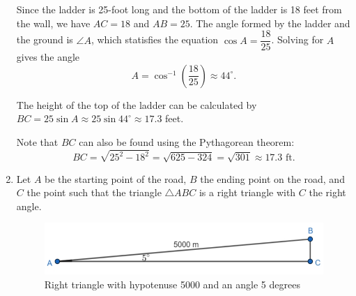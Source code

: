 \documentclass[
  12pt]{article}
\begin{document}
\begin{enumerate}
\begin{figure}[H]
  \end{figure}%

  Since the ladder is 25-foot long and the bottom of the ladder is 18
  feet from the wall, we have \(AC=18\) and \(AB=25\). The angle formed
  by the ladder and the ground is \(\angle A\), which statisfies the
  equation \(\cos A = \dfrac{18}{25}\). Solving for \(A\) gives the
  angle \[A = \cos^{-1}\left(\dfrac{18}{25}\right) \approx 44^\circ.\]

  The height of the top of the ladder can be calculated by
  \(BC = 25\sin A \approx 25\sin 44^\circ \approx 17.3\) feet.

  Note that \(BC\) can also be found using the Pythagorean theorem:
  \[BC = \sqrt{25^2-18^2} = \sqrt{625-324} = \sqrt{301} \approx 17.3 \text{ ft}.\]
\item
  Let \(A\) be the starting point of the road, \(B\) the ending point on
  the road, and \(C\) the point such that the triangle \(\triangle ABC\)
  is a right triangle with \(C\) the right angle.

  \begin{figure}[H]

  {\centering \includegraphics{Q24.jpeg}

  }

  \caption{Right triangle with hypotenuse 5000 and an angle 5 degrees}

  \end{figure}%


\end{enumerate}
\end{document}
